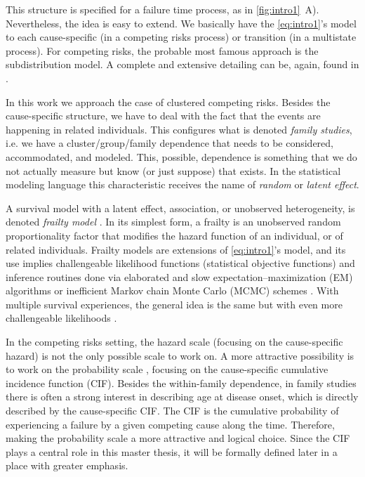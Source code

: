 This structure is specified for a failure time process, as in
\autoref{fig:intro1}~A). Nevertheless, the idea is easy to extend. We
basically have the \autoref{eq:intro1}'s model to each cause-specific
(in a competing risks process) or transition (in a multistate process).
For competing risks, the probable most famous approach is the
 subdistribution model. A complete and extensive
detailing can be, again, found in .

In this work we approach the case of clustered competing risks. Besides
the cause-specific structure, we have to deal with the fact that the
events are happening in related individuals. This configures what is
denoted \textit{family studies}, i.e. we have a cluster/group/family
dependence that needs to be considered, accommodated, and modeled. This,
possible, dependence is something that we do not actually measure but
know (or just suppose) that exists. In the statistical modeling language
this characteristic receives the name of \textit{random} or
\textit{latent effect}.

A survival model with a latent effect, association, or unobserved
heterogeneity, is denoted \textit{frailty model}
\cite{frailty78,frailty79,liang95,petersen98}. In its simplest form, a
frailty is an unobserved random proportionality factor that modifies the
hazard function of an individual, or of related individuals. Frailty
models are extensions of \autoref{eq:intro1}'s model, and its use
implies challengeable likelihood functions (statistical objective
functions) and inference routines done via elaborated and slow
expectation–maximization (EM) algorithms \cite{nielsen92,klein92} or
inefficient Markov chain Monte Carlo (MCMC) schemes \cite{hougaard00}.
With multiple survival experiences, the general idea is the same but
with even more challengeable likelihoods
\cite{prentice78,larson85,kuk92,therneau00}.

In the competing risks setting, the hazard scale (focusing on the
cause-specific hazard) is not the only possible scale to work on. A more
attractive possibility is to work on the probability scale
\cite{andersen12}, focusing on the cause-specific cumulative incidence
function (CIF). Besides the within-family dependence, in family studies
there is often a strong interest in describing age at disease onset,
which is directly described by the cause-specific CIF. The CIF is the
cumulative probability of experiencing a failure by a given competing
cause along the time. Therefore, making the probability scale a more
attractive and logical choice. Since the CIF plays a central role in
this master thesis, it will be formally defined later in a place with
greater emphasis.

